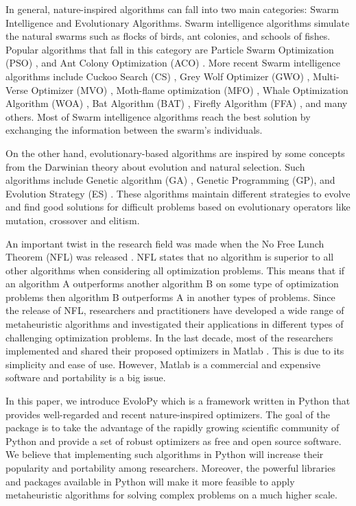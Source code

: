 \documentclass[a4paper,twoside]{article}
\begin{document}
In general, nature-inspired algorithms can fall into two main categories: Swarm Intelligence and Evolutionary Algorithms. Swarm intelligence algorithms simulate the natural swarms such as flocks of birds, ant colonies, and schools of fishes. Popular algorithms that fall in this category are Particle Swarm Optimization (PSO) \cite{Kennedy95}, and Ant Colony Optimization (ACO) \cite{Koro_ec_2009}. More recent Swarm intelligence algorithms include Cuckoo Search (CS) \cite{Yang2009}, Grey Wolf Optimizer (GWO) \cite{Mirjalili201446}, Multi-Verse Optimizer (MVO) \cite{Mirjalili2016}, Moth-flame optimization (MFO) \cite{Mirjalili2015228}, Whale Optimization Algorithm (WOA) \cite{Mirjalili201651}, Bat Algorithm (BAT) \cite{Yang2010}, Firefly Algorithm (FFA) \cite{Yang2010FFA}, and many others. Most of Swarm intelligence algorithms reach the best solution by exchanging the information between the swarm's individuals. 

On the other hand, evolutionary-based algorithms are inspired by some concepts from the Darwinian theory about evolution and natural selection. Such algorithms include Genetic algorithm (GA) \cite{Holland92}, Genetic Programming (GP)\cite{Koza1992}, and Evolution Strategy (ES) \cite{Beyer2002}. These algorithms maintain different strategies to evolve and find good solutions for difficult problems based on evolutionary operators like mutation, crossover and elitism. 

An important twist in the research field was made when the No Free Lunch Theorem (NFL) was released \cite{wolpert1997no,ho2002simple}. NFL states that no algorithm is superior to all other algorithms when considering all optimization problems. This means that if an algorithm A outperforms another algorithm B on some type of optimization problems then algorithm B outperforms A in another types of problems. Since the release of NFL, researchers and practitioners have developed a wide range of metaheuristic algorithms and investigated their applications in different types of challenging optimization problems. In the last decade, most of the researchers implemented and shared their proposed optimizers in Matlab \cite{Yang2010FFA,Yang2010,Mirjalili201446,Mirjalili2015228}. This is due to its simplicity and ease of use. However, Matlab is a commercial and expensive software and portability is a big issue.

In this paper, we introduce EvoloPy which is a framework written in Python that provides well-regarded and recent nature-inspired optimizers. The goal of the package is to take the advantage of the rapidly growing scientific community of Python and provide a set of robust optimizers as free and open source software. We believe that implementing such algorithms in Python will increase their popularity and portability among researchers. Moreover, the powerful libraries and packages available in Python will make it more feasible to apply metaheuristic algorithms for solving complex problems on a much higher scale.
\end{document}
